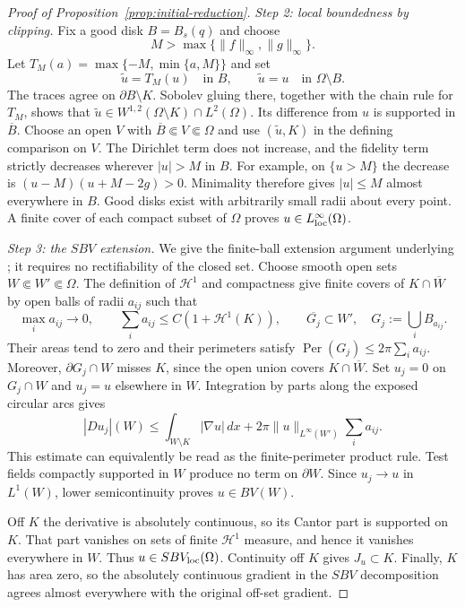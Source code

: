 \begin{proof}[Proof of Proposition~\ref{prop:initial-reduction}]
\smallskip
\noindent\emph{Step 2: local boundedness by clipping.}
Fix a good disk $B=B_s(q)$ and choose
\[M>\max\{\|f\|_\infty,\|g\|_\infty\}.\]
Let $T_M(a)=\max\{-M,\min\{a,M\}\}$ and set
\[
 \widetilde u=T_M(u)\quad\text{in }B,
 \qquad \widetilde u=u\quad\text{in }\Omega\setminus B.
\]
The traces agree on $\partial B\setminus K$.  Sobolev gluing there,
together with the chain rule for $T_M$, shows that
$\widetilde u\in W^{1,2}(\Omega\setminus K)\cap L^2(\Omega)$.
Its difference from $u$ is supported in $\overline B$.
Choose an open $V$ with
$\overline B\Subset V\Subset\Omega$ and use
$(\widetilde u,K)$ in the defining comparison on $V$.
The Dirichlet term does not increase, and the fidelity term
strictly decreases wherever $|u|>M$ in $B$.
For example, on $\{u>M\}$ the decrease is
$(u-M)(u+M-2g)>0$.
Minimality therefore gives $|u|\le M$ almost everywhere in $B$.
Good disks exist with arbitrarily small radii about every point.
A finite cover of each compact subset of $\Omega$ proves
$u\in L^\infty_{\rm loc}(\Omega)$.

\smallskip
\noindent\emph{Step 3: the $SBV$ extension.}
We give the finite-ball extension argument underlying
\cite[Proposition~4.4]{ambrosio_fusco_pallara2000}; it requires no
rectifiability of the closed set.
Choose smooth open sets $W\Subset W'\Subset\Omega$.
The definition of $\mathcal H^1$ and compactness give finite
covers of $K\cap\overline W$ by open balls of radii $a_{ij}$ such
that
\[
 \max_i a_{ij}\longrightarrow0,
 \qquad \sum_i a_{ij}\le C(1+\mathcal H^1(K)),
 \qquad \overline{G_j}\subset W',
 \quad G_j:=\bigcup_i B_{a_{ij}}.
\]
Their areas tend to zero and their perimeters satisfy
$\operatorname{Per}(G_j)\le2\pi\sum_i a_{ij}$.
Moreover, $\partial G_j\cap W$ misses $K$, since the open union
covers $K\cap\overline W$.
Set $u_j=0$ on $G_j\cap W$ and $u_j=u$ elsewhere in $W$.
Integration by parts along the exposed circular arcs gives
\[
 |Du_j|(W)
 \le\int_{W\setminus K}|\nabla u|\,dx
      +2\pi\|u\|_{L^\infty(W')}\sum_i a_{ij}.
\]
This estimate can equivalently be read as the finite-perimeter
product rule.  Test fields compactly supported in $W$ produce no
term on $\partial W$.
Since $u_j\to u$ in $L^1(W)$, lower semicontinuity proves
$u\in BV(W)$.

Off $K$ the derivative is absolutely continuous, so its Cantor
part is supported on $K$.  That part vanishes on sets of finite
$\mathcal H^1$ measure, and hence it vanishes everywhere in $W$.
Thus $u\in SBV_{\rm loc}(\Omega)$.
Continuity off $K$ gives $J_u\subset K$.
Finally, $K$ has area zero, so the absolutely continuous gradient
in the $SBV$ decomposition agrees almost everywhere with the
original off-set gradient.


\end{proof}
